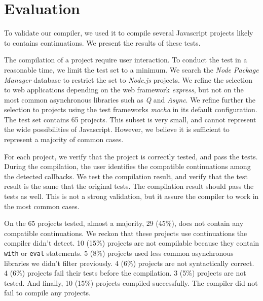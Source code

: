 \section{Evaluation} \label{section:evaluation}

To validate our compiler, we used it to compile several Javascript projects likely to contains continuations.
We present the results of these tests.


The compilation of a project require user interaction.
To conduct the test in a reasonable time, we limit the test set to a minimum.
We search the \textit{Node Package Manager} database to restrict the set to \textit{Node.js} projects.
We refine the selection to web applications depending on the web framework \textit{express}, but not on the most common asynchronous libraries such as \textit{Q} and \textit{Async}.
We refine further the selection to projects using the test frameworks \textit{mocha} in its default configuration.
The test set contains 65 projects.
This subset is very small, and cannot represent the wide possibilities of Javascript.
However, we believe it is sufficient to represent a majority of common cases.


For each project, we verify that the project is correctly tested, and pass the tests.
During the compilation, the user identifies the compatible continuations among the detected callbacks.
We test the compilation result, and verify that the test result is the same that the original tests.
The compilation result should pass the tests as well.
This is not a strong validation, but it assure the compiler to work in the most common cases.


On the 65 projects tested, almost a majority, 29 (45\%), does not contain any compatible continuations.
We reckon that these projects use continuations the compiler didn't detect.
10 (15\%) projects are not compilable because they contain \texttt{with} or \texttt{eval} statements.
5 (8\%) projects used less common asynchronous libraries we didn't filter previously.
4 (6\%) projects are not syntactically correct.
4 (6\%) projects fail their tests before the compilation.
3 (5\%) projects are not tested.
And finally, 10 (15\%) projects compiled successfully.
The compiler did not fail to compile any projects.

